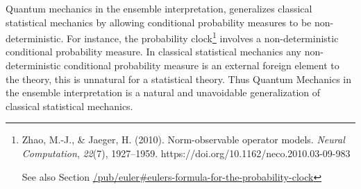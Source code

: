 \documentclass[11pt]{book}
\begin{document}
Quantum mechanics in the ensemble interpretation, generalizes classical
statistical mechanics by allowing conditional probability measures to be
non-deterministic. For instance, the probability clock\footnote{Zhao,
  M.-J., \& Jaeger, H. (2010). Norm-observable operator models.
  \emph{Neural Computation}, \emph{22}(7), 1927--1959.
  https://doi.org/10.1162/neco.2010.03-09-983

  See also Section
  \url{/pub/euler\#eulers-formula-for-the-probability-clock}} involves a
non-deterministic conditional probability measure. In classical
statistical mechanics any non-deterministic conditional probability
measure is an external foreign element to the theory, this is unnatural
for a statistical theory. Thus Quantum Mechanics in the ensemble
interpretation is a natural and unavoidable generalization of classical
statistical mechanics.
\end{document}

